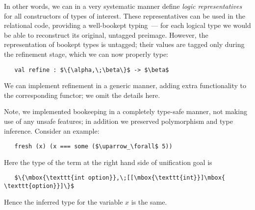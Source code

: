 In other words, we can in a very systematic manner define \emph{logic representatives} for all constructors
of types of interest. These representatives can be used in the relational code, providing a well-bookept
typing~--- for each logical type we would be able to reconstruct its original, untagged preimage. However,
the representation of bookept types is untagged; their values are tagged only during the refinement
stage, which we can now properly type:

\begin{lstlisting}
   val refine : $\{\alpha,\;\beta\}$ -> $\beta$
\end{lstlisting}

We can implement refinement in a generic manner, adding extra functionality to the corresponding functor; we
omit the details here.

Note, we implemented bookeeping in a completely type-safe manner, not making use of any unsafe features; in addition
we preserved polymorphism and type inference. Consider an example:

\begin{lstlisting}
   fresh (x) (x === some ($\uparrow_\forall$ 5))
\end{lstlisting}

Here the type of the term at the right hand side of unification goal is 

\begin{lstlisting}
   $\{\mbox{\texttt{int option}},\;[[\mbox{\texttt{int}}]\mbox{ \texttt{option}}]\}$
\end{lstlisting}

Hence the inferred type for the variable $x$ is the same.

